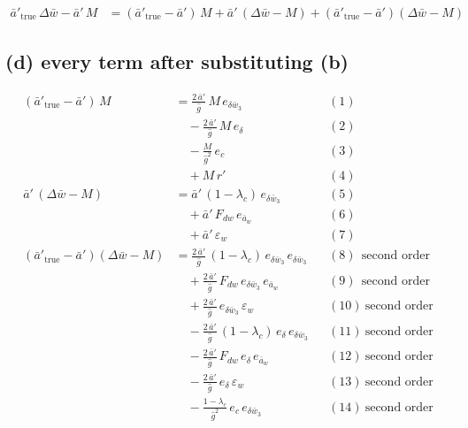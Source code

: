 \documentclass[11pt,a4paper,fontset=none]{ctexart}
\newcommand{\ba}{\bar{a}}
\newcommand{\bw}{\bar{w}}
\newcommand{\dW}{\Delta\bw}
\newcommand{\ap}{\ba'}
\newcommand{\dl}{\delta}
\newcommand{\gh}{\hat{g}}
\begin{document}
\begin{align*}
\ap_{\mathrm{true}}\,\dW - \ap\,M
  &= (\ap_{\mathrm{true}} - \ap)\,M + \ap\,(\dW - M) + (\ap_{\mathrm{true}} - \ap)(\dW - M)
\end{align*}

\subsection*{(d) every term after substituting (b)}

\begin{align*}
(\ap_{\mathrm{true}} - \ap)\,M
  &= \frac{2\,\ap}{\gh}\,M\,e_{\delta\bw_3}                                      && (1) \\
  &\quad - \frac{2\,\ap}{\gh}\,M\,e_{\dl}                                        && (2) \\
  &\quad - \frac{M}{\gh^{2}}\,e_c                                                && (3) \\
  &\quad + M\,r'                                                                 && (4) \\[6pt]
\ap\,(\dW - M)
  &= \ap\,(1-\lambda_c)\,e_{\delta\bw_3}                                         && (5) \\
  &\quad + \ap\,F_{dw}\,e_{\ba_w}                                                && (6) \\
  &\quad + \ap\,\varepsilon_w                                                    && (7) \\[6pt]
(\ap_{\mathrm{true}} - \ap)(\dW - M)
  &= \frac{2\,\ap}{\gh}\,(1-\lambda_c)\,e_{\delta\bw_3}\,e_{\delta\bw_3}          && (8)\ \ \text{second order} \\
  &\quad + \frac{2\,\ap}{\gh}\,F_{dw}\,e_{\delta\bw_3}\,e_{\ba_w}                 && (9)\ \ \text{second order} \\
  &\quad + \frac{2\,\ap}{\gh}\,e_{\delta\bw_3}\,\varepsilon_w                     && (10)\ \text{second order} \\
  &\quad - \frac{2\,\ap}{\gh}\,(1-\lambda_c)\,e_{\dl}\,e_{\delta\bw_3}            && (11)\ \text{second order} \\
  &\quad - \frac{2\,\ap}{\gh}\,F_{dw}\,e_{\dl}\,e_{\ba_w}                         && (12)\ \text{second order} \\
  &\quad - \frac{2\,\ap}{\gh}\,e_{\dl}\,\varepsilon_w                             && (13)\ \text{second order} \\
  &\quad - \frac{1-\lambda_c}{\gh^{2}}\,e_c\,e_{\delta\bw_3}                      && (14)\ \text{second order} \\

\end{align*}
\end{document}
